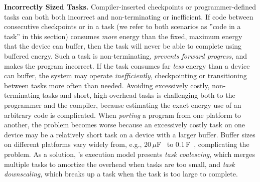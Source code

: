 \textbf{Incorrectly Sized Tasks.} Compiler-inserted checkpoints or
programmer-defined tasks can both both incorrect and non-terminating or
inefficient.  If code between consecutive checkpoints or in a task (we refer to
both scenarios as ''code in a task'' in this section) consumes {\em more}
energy than the fixed, maximum energy that the device can buffer, then the task
will never be able to complete using buffered energy.  Such a task is
non-terminating, {\em prevents forward progress}, and makes the program
incorrect. 
%
If the task consumes far {\em less} energy than a device can buffer, the system
may operate {\em inefficiently}, checkpointing or transitioning between tasks
more often than needed. 
%
Avoiding excessively costly, non-terminating tasks and short, high-overhead
tasks is challenging both to the programmer and the compiler, because
estimating the exact energy use of an arbitrary code is complicated.  When {\em
porting} a program from one platform to another, the problem becomes worse
because an excessively costly task on one device may be a relatively short task
on a device with a larger buffer.  Buffer sizes on different platforms vary
widely from, e.g., 20\,$\mu $F~\cite{rodriguez_tbcs_2015} to 0.1\,F~\cite{moo},
complicating the problem.
%
As a solution, \sys's execution model presents {\em task coalescing}, which
merges multiple tasks to amortize the overhead when tasks are too small, and
{\em task downscaling}, which breaks up a task when the task is too large to complete. 


